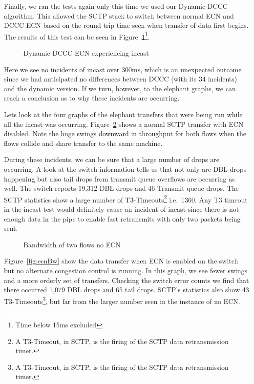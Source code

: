 \documentclass[12pt]{article}
\begin{document}
\newpage

Finally, we ran the tests again only this time we used our Dynamic DCCC algorithm. This allowed the
SCTP stack to switch between normal ECN and DCCC ECN based on the round trip time
seen when transfer of data first begins. The results of this test can be seen in Figure~\ref{fig:dynIncast}\footnote{Time below 15ms excluded}.


\begin{figure}[h]
\centering
{}
\caption{Dynamic DCCC ECN experiencing incast}
\label{fig:dynIncast}
\end{figure}

Here we see no incidents of incast over 300ms, which is an unexpected
outcome since we had anticipated no differences between DCCC (with its 34 incidents) and
the dynamic version. If we turn, however, to the elephant graphs, we can reach a conclusion
as to why these incidents are occurring.

\newpage

Lets look at the four graphs of the elephant transfers that were being run while all
the incast was occurring. Figure~\ref{fig:noEcnBw} shows a normal SCTP transfer with
ECN disabled. Note the huge swings downward in throughput for both
flows when the flows collide and share transfer to the same machine. 

During these incidents, we can be sure that a large number of drops are occurring. A look at the switch
information tells us that not only are DBL drops happening but also tail
drops from transmit queue overflows are occurring as well.  The switch reports 19,312 DBL drops
and 46 Transmit queue drops. The SCTP statistics show
a large number of T3-Timeouts\footnote{A T3-Timeout, in SCTP, is the firing of the SCTP data retransmission timer.}
 i.e.~1360. Any T3 timeout in the incast test would definitely
cause an incident of incast since there is not enough data in the pipe to enable fast retransmits with
only two packets being sent.

\begin{figure}[h]
\centering
{}
\caption{Bandwidth of two flows no ECN}
\label{fig:noEcnBw}
\end{figure}


\newpage

Figure~\ref{fig:ecnBw} show the data transfer when ECN is enabled on
the switch but no alternate congestion control is running. In this graph,
we see fewer swings and a more orderly set of transfers. Checking
the switch error counts we find that there occurred 1,079 DBL drops and 65 tail
drops. SCTP's statistics also show 43 T3-Timeouts\footnote{A T3-Timeout, in SCTP, is the firing of the SCTP data retransmission timer.},
but far from the larger number seen in the instance of no ECN.
\end{document}
